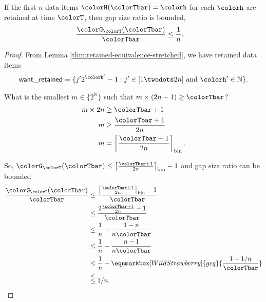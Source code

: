 \begin{lemma}
\label{thm:gap-size-ratio-stretched}
If the first $n$ data items $\colorH(\colorTbar) = \colorh$ for each \hv{} $\colorh$ are retained at time $\colorT$, then gap size ratio is bounded,
\begin{align*}
\frac{\colorG_{\colorT}(\colorTbar)}{\colorTbar}
&\leq
\frac{1}{n}.
\end{align*}
\end{lemma}
\begin{proof}

From Lemma \ref{thm:retained-equivalence-stretched}, we have retained data items
\begin{align*}
\mathsf{want\_retained} =
\{
  j'2^{\colorh'} - 1
  :
  j' \in [1 \twodots 2n]
  \text{ and }
  \colorh' \in \mathbb{N}
\}.
\end{align*}


What is the smallest $m \in \{2^{\mathbb{N}}\}$ such that $m \times (2n - 1) \geq \colorTbar$?
\begin{align*}
m \times 2n
&\geq \colorTbar + 1\\
m
&\geq \frac{\colorTbar + 1}{2n}\\
m
&= \left\lceil \frac{\colorTbar + 1 }{2n} \right\rceil_{\mathrm{bin}}.
\end{align*}

So, $\colorG_{\colorT}(\colorTbar) \leq \left\lceil \frac{\colorTbar + 1 }{2n} \right\rceil_{\mathrm{bin}} - 1$ and gap size ratio can be bounded
\begin{align*}
\frac{\colorG_{\colorT}(\colorTbar)}{\colorTbar}
&\leq
\frac{
\left\lceil \frac{\colorTbar + 1 }{2n} \right\rceil_{\mathrm{bin}} - 1
}{
\colorTbar
}\\
&\leq
\frac{
2\frac{\colorTbar + 1}{2n} - 1
}{
\colorTbar
}\\
&\leq
\frac{1}{n} + \frac{1 - n}{n\colorTbar}\\
&\leq
\frac{1}{n} - \frac{n - 1}{n\colorTbar}\\
&\leq
\frac{1}{n} - \eqnmarkbox[WildStrawberry]{geq}{\frac{1 - 1/n}{\colorTbar}}\\
&\stackrel{\checkmark}{\leq}
1 / n.
\end{align*}

\end{proof}
